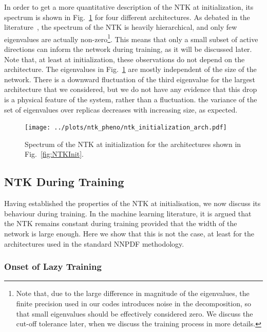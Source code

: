 In order to get a more quantitative description of the NTK 
at initialization, its spectrum is shown in Fig.~\ref{fig:NTKSpectrum} for four different architectures. 
As debated in the literature~\cite{XXX}, the spectrum of the NTK is heavily hierarchical, and only few
eigenvalues are actually non-zero\footnote{Note that, due to the large
difference in magnitude of the eigenvalues, the finite precision used in our
codes introduces noise in the decomposition, so that small eigenvalues
should be effectively considered zero. We discuss the cut-off tolerance
later, when we discuss the training process in more details.}. This means that
only a small subset of active directions can inform the network during training,
as it will be discussed later. Note that, at least at initialization, these
observations do not depend on the architecture. The eigenvalues in Fig.~\ref{fig:NTKSpectrum} 
are mostly independent of the size of the network. There is a downward fluctuation of the third
eigenvalue for the largest architecture that we considered, but we do not have any 
evidence that this drop is a physical feature of the system, rather than a fluctuation. 
the variance of the set of eigenvalues over replicas decreases with increasing 
size, as expected. 

\begin{figure}[ht!]
  \centering

  \texttt{[image: ../plots/ntk\_pheno/ntk\_initialization\_arch.pdf]}
  \caption{Spectrum of the NTK at initialization for the architectures shown in
  Fig.~\ref{fig:NTKInit}. }
  \label{fig:NTKSpectrum}
\end{figure}

\FloatBarrier

\subsection{NTK During Training}
\label{sec:NTKDuringTraining}

Having established the properties of the NTK at initialisation, we now discuss
its behaviour during training. In the machine learning literature, it is argued
that the NTK remains constant during training provided that the width of the
network is large enough. Here we show that this is not the case, at least for
the architectures used in the standard NNPDF methodology. 

\subsubsection{Onset of Lazy Training} 
\label{sec:OnsetLazyTraining}

